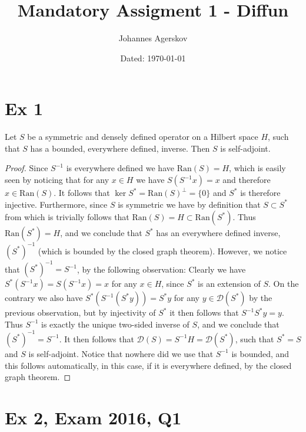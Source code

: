 \documentclass[a4paper,11pt]{article}
\author{Johannes Agerskov}
\date{Dated: \today}
\title{Mandatory Assigment 1 - Diffun}
\newcommand{\Ran}[1]{\text{Ran}\left(#1\right)}
\numberwithin{equation}{section}
\begin{document}
\maketitle	

\section*{Ex 1}
\setcounter{section}{1}
Let $ S $ be a symmetric and densely defined operator on a Hilbert space $ H $, such that $ S $ has a bounded, everywhere defined, inverse. Then $ S $ is self-adjoint.
\begin{proof}
	Since $ S^{-1} $ is everywhere defined we have $ \Ran{S}=H $, which is easily seen by noticing that for any $ x\in H $ we have $ S(S^{-1}x)=x $ and therefore $ x\in \Ran{S} $. It follows that $ \ker{S^*}=\Ran{S}^\perp=\{0\} $ and $ S^* $ is therefore injective. Furthermore, since $ S $ is symmetric we have by definition that $ S\subset S^* $ from which is trivially follows that $ \Ran{S}=H\subset\Ran{S^*} $. Thus $ \Ran{S^*}=H $, and we conclude that $ S^* $ has an everywhere defined inverse, $ (S^*)^{-1} $ (which is bounded by the closed graph theorem). However, we notice that $ (S^*)^{-1}=S^{-1} $, by the following observation: Clearly we have $ S^*(S^{-1}x)=S(S^{-1}x)=x $ for any $ x\in H $, since $ S^* $ is an extension of $ S $. On the contrary we also have $ S^*(S^{-1}(S^*y))=S^*y $ for any $ y\in\mathcal{D}(S^*) $ by the previous observation, but by injectivity of $ S^* $ it then follows that $ S^{-1}S^*y=y $. Thus $ S^{-1} $ is exactly the unique two-sided inverse of $ S $, and we conclude that $ (S^*)^{-1}=S^{-1} $. It then follows that $ \mathcal{D}(S)=S^{-1}H=\mathcal{D}(S^*) $, such that $ S^*=S $ and $ S $ is self-adjoint. Notice that nowhere did we use that $ S^{-1} $ is bounded, and this follows automatically, in this case, if it is everywhere defined, by the closed graph theorem.
\end{proof}

\section*{Ex 2, Exam 2016, Q1}
\setcounter{section}{2}
\end{document}
